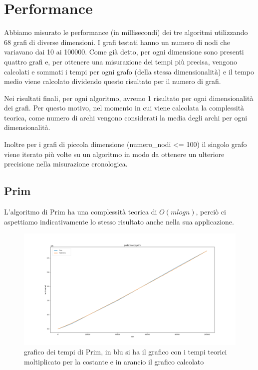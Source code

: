 \section{Performance}
Abbiamo misurato le performance (in millisecondi) dei tre algoritmi utilizzando 68 grafi di diverse dimensioni.
I grafi testati hanno un numero di nodi che variavano dai  10 ai 100000.
Come già detto, per ogni dimensione sono presenti quattro grafi e, per ottenere una misurazione dei tempi più precisa, vengono calcolati e sommati i tempi per ogni grafo (della stessa dimensionalità) e il tempo medio viene calcolato dividendo questo risultato per il numero di grafi.

Nei risultati finali, per ogni algoritmo, avremo 1 risultato per ogni dimensionalità dei grafi. 
Per questo motivo, nel momento in cui viene calcolata la complessità teorica, come numero di archi vengono considerati la media degli archi per ogni dimensionalità. 

Inoltre per i grafi di piccola dimensione (numero\_nodi <= 100) il singolo grafo viene iterato più volte su un algoritmo in modo da ottenere un ulteriore precisione nella misurazione cronologica.

\subsection{Prim}
L'algoritmo di Prim ha una complessità teorica di $O(mlogn)$, perciò ci aspettiamo indicativamente lo stesso risultato anche nella sua applicazione.

\begin{figure}[htbp]
    \centering
    \centerline{\includegraphics[scale = 0.38]{Fig/primFinale.png}}
    \caption{grafico dei tempi di Prim, in blu si ha il grafico con i tempi teorici moltiplicato per la costante e in arancio il grafico calcolato}
    \label{Prim}
\end{figure}



